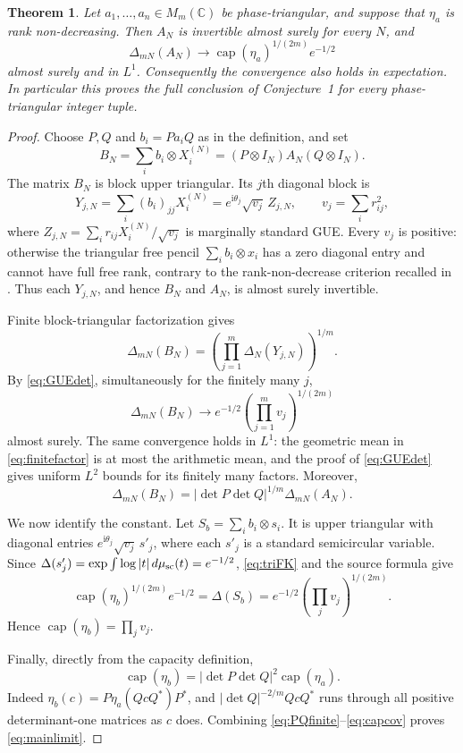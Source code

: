 \documentclass[11pt]{article}
\newtheorem{theorem}{Theorem}
\newcommand{\C}{\mathbb C}
\newcommand{\capc}{\operatorname{cap}}
\newcommand{\D}{\Delta}
\begin{document}
\begin{theorem}\label{thm:triangular}
Let $a_1,\ldots,a_n\in M_m(\C)$ be phase-triangular, and suppose that
$\eta_a$ is rank non-decreasing.  Then $A_N$ is invertible almost surely for
every $N$, and
\begin{equation}\label{eq:mainlimit}
 \D_{mN}(A_N)\longrightarrow
 \capc(\eta_a)^{1/(2m)}e^{-1/2}
\end{equation}
almost surely and in $L^1$.  Consequently the convergence also holds in
expectation.  In particular this proves the full conclusion of Conjecture~1
for every phase-triangular integer tuple.
\end{theorem}

\begin{proof}
Choose $P,Q$ and $b_i=Pa_iQ$ as in the definition, and set
\[
 B_N=\sum_i b_i\otimes X_i^{(N)}
     =(P\otimes I_N)A_N(Q\otimes I_N).
\]
The matrix $B_N$ is block upper triangular.  Its $j$th diagonal block is
\[
 Y_{j,N}=\sum_i(b_i)_{jj}X_i^{(N)}
   =e^{\mathrm i\theta_j}\sqrt{v_j}\,Z_{j,N},
 \qquad v_j=\sum_i r_{ij}^2,
\]
where $Z_{j,N}=\sum_i r_{ij}X_i^{(N)}/\sqrt{v_j}$ is marginally standard
GUE.  Every $v_j$ is positive: otherwise the triangular free pencil
$\sum_i b_i\otimes x_i$ has a zero diagonal entry and cannot have full free
rank, contrary to the rank-non-decrease criterion recalled in \cite{MS}.
Thus each $Y_{j,N}$, and hence $B_N$ and $A_N$, is almost surely invertible.

Finite block-triangular factorization gives
\begin{equation}\label{eq:finitefactor}
 \D_{mN}(B_N)=\left(\prod_{j=1}^m\D_N(Y_{j,N})\right)^{1/m}.
\end{equation}
By \eqref{eq:GUEdet}, simultaneously for the finitely many $j$,
\[
 \D_{mN}(B_N)\longrightarrow
 e^{-1/2}\left(\prod_{j=1}^m v_j\right)^{1/(2m)}
\]
almost surely.  The same convergence holds in $L^1$: the geometric mean in
\eqref{eq:finitefactor} is at most the arithmetic mean, and the proof of
\eqref{eq:GUEdet} gives uniform $L^2$ bounds for its finitely many factors.
Moreover,
\begin{equation}\label{eq:PQfinite}
 \D_{mN}(B_N)=|\det P\det Q|^{1/m}\D_{mN}(A_N).
\end{equation}

We now identify the constant.  Let $S_b=\sum_i b_i\otimes s_i$.  It is upper
triangular with diagonal entries
$e^{\mathrm i\theta_j}\sqrt{v_j}\,s'_j$, where each $s'_j$ is a standard
semicircular variable.  Since
$\D(s'_j)=\exp\int\log|t|\,d\mu_{\rm sc}(t)=e^{-1/2}$,
\eqref{eq:triFK} and the source formula give
\[
 \capc(\eta_b)^{1/(2m)}e^{-1/2}
 =\D(S_b)
 =e^{-1/2}\left(\prod_jv_j\right)^{1/(2m)}.
\]
Hence $\capc(\eta_b)=\prod_jv_j$.

Finally, directly from the capacity definition,
\begin{equation}\label{eq:capcov}
 \capc(\eta_b)=|\det P\det Q|^2\capc(\eta_a).
\end{equation}
Indeed $\eta_b(c)=P\eta_a(QcQ^*)P^*$, and
$|\det Q|^{-2/m}QcQ^*$ runs through all positive determinant-one matrices as
$c$ does.  Combining \eqref{eq:PQfinite}--\eqref{eq:capcov} proves
\eqref{eq:mainlimit}.
\end{proof}
\end{document}
